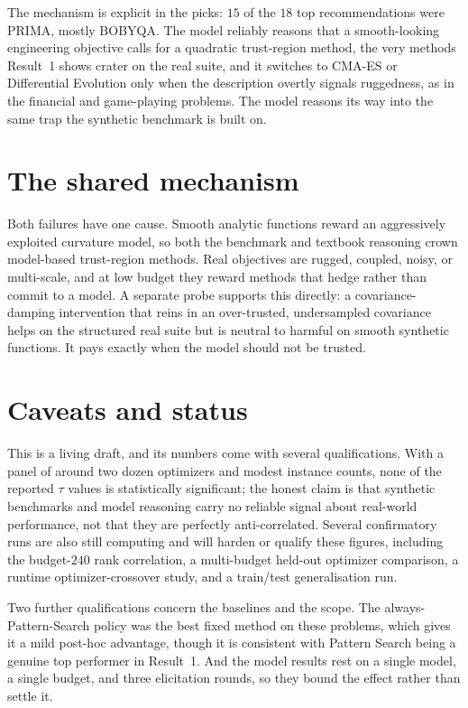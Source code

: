 \documentclass[11pt]{article}
\begin{document}
The mechanism is explicit in the picks: $15$ of the $18$ top recommendations were PRIMA,
mostly BOBYQA. The model reliably reasons that a smooth-looking engineering objective
calls for a quadratic trust-region method, the very methods Result~1 shows crater on the
real suite, and it switches to CMA-ES or Differential Evolution only when the
description overtly signals ruggedness, as in the financial and game-playing problems.
The model reasons its way into the same trap the synthetic benchmark is built on.

\section{The shared mechanism}

Both failures have one cause. Smooth analytic functions reward an aggressively exploited
curvature model, so both the benchmark and textbook reasoning crown model-based
trust-region methods. Real objectives are rugged, coupled, noisy, or multi-scale, and at
low budget they reward methods that hedge rather than commit to a model. A separate probe
supports this directly: a covariance-damping intervention that reins in an over-trusted,
undersampled covariance helps on the structured real suite but is neutral to harmful on
smooth synthetic functions. It pays exactly when the model should not be trusted.

\section{Caveats and status}
\label{sec:caveats}

This is a living draft, and its numbers come with several qualifications. With a panel of
around two dozen optimizers and modest instance counts, none of the reported $\tau$
values is statistically significant; the honest claim is that synthetic benchmarks and
model reasoning carry no reliable signal about real-world performance, not that they are
perfectly anti-correlated. Several confirmatory runs are also still computing and will
harden or qualify these figures, including the budget-$240$ rank correlation, a
multi-budget held-out optimizer comparison, a runtime optimizer-crossover study, and a
train/test generalisation run.

Two further qualifications concern the baselines and the scope. The always-Pattern-Search
policy was the best fixed method on these problems, which gives it a mild post-hoc
advantage, though it is consistent with Pattern Search being a genuine top performer in
Result~1. And the model results rest on a single model, a single budget, and three
elicitation rounds, so they bound the effect rather than settle it.
\end{document}
